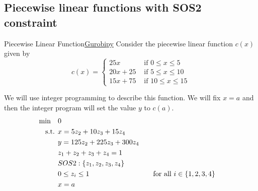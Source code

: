 \subsection{Piecewise linear functions with SOS2 constraint}
\label{subsec:pwl-sos2}
\begin{examplewithcode}{Piecewise Linear Function}{\href{https://github.com/open-optimization/open-optimization-or-examples/blob/master/nonlinear-programming/Gurobi-SOS-Examples.ipynb}{Gurobipy}}
\label{example:pwl}
Consider the piecewise linear function 
 $c(x)$ given by
$$
c(x) = 
\begin{cases}
25x  & \text{ if } 0 \leq x \leq 5\\
20x + 25 & \text{ if } 5 \leq x \leq 10\\
15x + 75 & \text{ if } 10 \leq x \leq 15
\end{cases}
$$
\begin{center}
\par{}\label{fig:pwl-plot}%

\end{center}

We will use integer programming to describe this function.  We will fix $x = a$ and then the integer program will set the value $y$ to $c(a)$.
\begin{align*}
\min \quad & 0 \\
\text{ s.t. }        & x = 5 z_{2} +10 z_{3} + 15 z_{4} \\
 & y = 125 z_{2} + 225 z_{3} + 300 z_{4} \\
 & z_{1} + z_{2} + z_{3} + z_{4} = 1 \\
 & SOS2: \{z_1, z_2, z_3, z_4\} \\
 & 0 \leq z_{i} \leq 1 &&\quad \text{for all } i \in \{1,2,3,4\} \\
 & x = a \\
\end{align*}

\end{examplewithcode}

